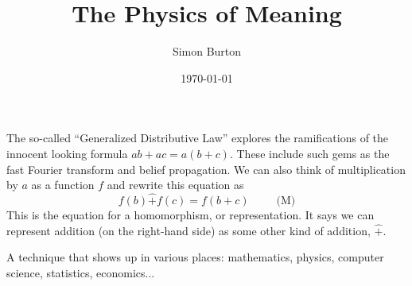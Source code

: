 \documentclass[11pt]{article}
\begin{document}
\title{The Physics of Meaning}

\author{Simon Burton}

\date{\today}


\maketitle


\def\Z{\mathbb Z}
\def\R{\mathbb R}
\def\Expect{\mathbb E}
\def\Ind{\mathbb I}
\def\Complex{\mathbb{C}}
\def\GL{\mathrm{GL}}
\def\half{\frac{1}{2}}
\def\todo#1{\emph{(XXX #1 XXX)}}


%
%


The so-called ``Generalized Distributive Law''
\cite{Aji2000}
explores the ramifications of the innocent looking
formula $ab+ac = a(b+c).$
These include such gems as the fast Fourier transform
and belief propagation.
We can also think of multiplication by $a$ as a function $f$
and rewrite this equation as 
$$
    f(b)\hat{+}f(c)=f(b+c) \ \ \ \ \ \ \ \ \ \ \ \mbox{(M)}
$$
This is the equation for a homomorphism, or representation.
It says we can represent addition (on the right-hand side)
as some other kind of addition, $\hat{+}.$

A technique that shows up in various places:
mathematics, physics, computer science, statistics, economics...

\end{document}
